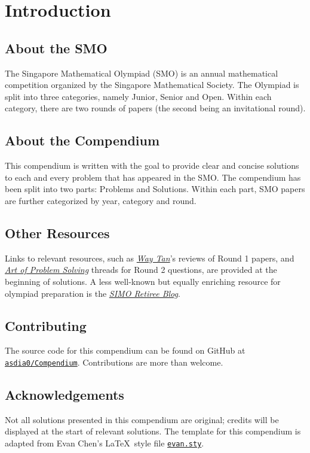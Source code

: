 \chapter{Introduction}

\section*{About the SMO}
The Singapore Mathematical Olympiad (SMO) is an annual mathematical competition organized by the Singapore Mathematical Society. The Olympiad is split into three categories, namely Junior, Senior and Open. Within each category, there are two rounds of papers (the second being an invitational round).

\section*{About the Compendium}

This compendium is written with the goal to provide clear and concise solutions to each and every problem that has appeared in the SMO. The compendium has been split into two parts: Problems and Solutions. Within each part, SMO papers are further categorized by year, category and round.

\section*{Other Resources}
Links to relevant resources, such as \href{https://www.youtube.com/c/WayTan}{\textit{Way Tan}}'s reviews of Round 1 papers, and \href{https://artofproblemsolving.com/}{\textit{Art of Problem Solving}} threads for Round 2 questions, are provided at the beginning of solutions. A less well-known but equally enriching resource for olympiad preparation is the \href{https://simoxmenblog.blogspot.com/}{\textit{SIMO Retiree Blog}}.

\section*{Contributing}

The source code for this compendium can be found on GitHub at \href{https://github.com/asdia0/Compendium}{\texttt{asdia0/Compendium}}. Contributions are more than welcome.

\section*{Acknowledgements}

Not all solutions presented in this compendium are original; credits will be displayed at the start of relevant solutions. The template for this compendium is adapted from Evan Chen's  \LaTeX\ style file \href{https://github.com/vEnhance/dotfiles/blob/main/texmf/tex/latex/evan/evan.sty}{\texttt{evan.sty}}.
